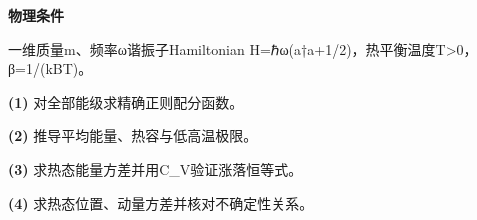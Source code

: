 \textbf{物理条件}\par 一维质量m、频率ω谐振子Hamiltonian H=ℏω(a†a+1/2)，热平衡温度T>0，β=1/(kBT)。
\par\noindent\textbf{(1)} 对全部能级求精确正则配分函数。
\par\noindent\textbf{(2)} 推导平均能量、热容与低高温极限。
\par\noindent\textbf{(3)} 求热态能量方差并用C\_V验证涨落恒等式。
\par\noindent\textbf{(4)} 求热态位置、动量方差并核对不确定性关系。
